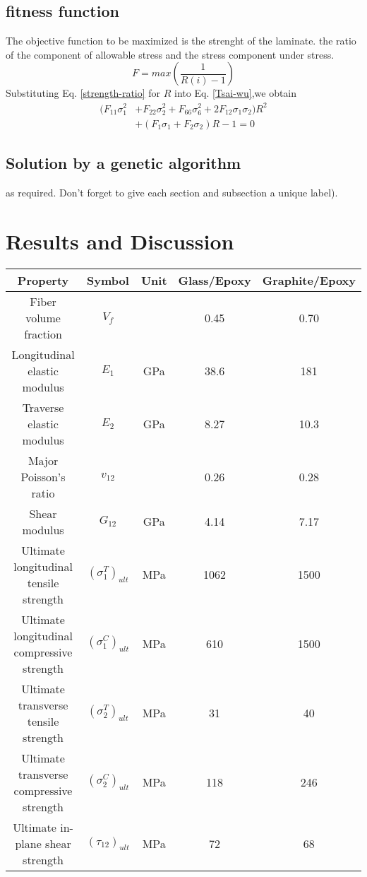 \documentclass[smallextended]{svjour3}       %
\begin{document}
\subsection{fitness function}
The objective function to be maximized is the strenght of the laminate.
the ratio of the component of allowable stress and the stress component under stress.
\begin{equation*}\label{strength-ratio}
	F=max(\frac{1}{R(i)-1})
\end{equation*}
Substituting Eq. \ref{strength-ratio} for $R$ into Eq. \ref{Tsai-wu},we obtain
\begin{equation*}
	\begin{split}
		(F_{11}\sigma_1^2&+F_{22}\sigma_2^2+F_{66}\sigma_6^2+2F_{12}\sigma_1\sigma_2)R^2 \\
						 &+(F_1\sigma_1+F_2\sigma_2)R-1=0
	\end{split}
\end{equation*}



\subsection{Solution by a genetic algorithm}\label{sec:2}
as required. Don't forget to give each section
and subsection a unique label).




\section{Results and Discussion}

\begin{tabular}{ccccc}
	\toprule
	Property								  & Symbol	   & Unit &  Glass/Epoxy &  Graphite/Epoxy  \\
	\midrule
	Fiber volume fraction					  & $V_f$		      &      &  0.45        &  0.70   \\
	Longitudinal elastic modulus			  & $E_1$		      & GPa  &  38.6        &  181  \\
	Traverse elastic modulus				  & $E_2$		      & GPa  &  8.27        &  10.3  \\
	Major Poisson's ratio					  & $v_{12}$	      &      &  0.26        &  0.28  \\
	Shear modulus							  & $G_{12}$	      & GPa  &  4.14        &  7.17  \\
	Ultimate longitudinal tensile strength    &  $(\sigma_1^T)_{ult}$ & MPa  &  1062        &  1500  \\
	Ultimate longitudinal compressive strength & $(\sigma_1^C)_{ult}$ & MPa  &  610        &  1500  \\
	Ultimate transverse tensile strength    &  $(\sigma_2^T)_{ult}$ & MPa  &  31        &  40 \\
	Ultimate transverse compressive strength & $(\sigma_2^C)_{ult}$ & MPa  &  118        &  246\\
	Ultimate in-plane shear strength          & $(\tau_{12})_{ult}$ & MPa  &  72&  68\\
	\bottomrule
\end{tabular}
\end{document}
